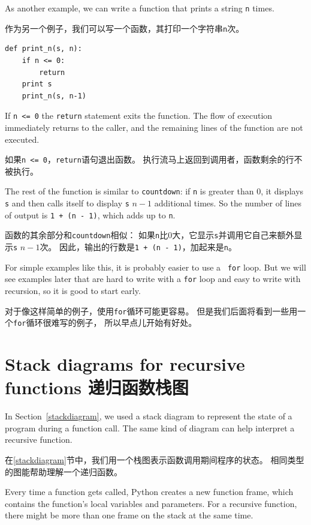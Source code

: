 \documentclass[10pt]{book}
\begin{document}
\begin{CJK}{UTF8}{gbsn}
As another example, we can write a function that prints a
string {\tt n} times.

作为另一个例子，我们可以写一个函数，其打印一个字符串{\tt n}次。

\begin{verbatim}
def print_n(s, n):
    if n <= 0:
        return
    print s
    print_n(s, n-1)
\end{verbatim}
%
If {\tt n <= 0} the {\tt return} statement exits the function.  The
flow of execution immediately returns to the caller, and the remaining
lines of the function are not executed.

如果{\tt n <= 0}，{\tt return}语句退出函数。
执行流马上返回到调用者，函数剩余的行不被执行。

The rest of the function is similar to {\tt countdown}: if {\tt n} is
greater than 0, it displays {\tt s} and then calls itself to display
{\tt s} $n-1$ additional times.  So the number of lines of output
is {\tt 1 + (n - 1)}, which adds up to {\tt n}.

函数的其余部分和{\tt countdown}相似：
如果{\tt n}比0大，它显示{\tt s}并调用它自己来额外显示{\tt s} $n-1$次。
因此，输出的行数是{\tt 1 + (n - 1)}，加起来是{\tt n}。

For simple examples like this, it is probably easier to use a {\tt
for} loop.  But we will see examples later that are hard to write
with a {\tt for} loop and easy to write with recursion, so it is
good to start early.

对于像这样简单的例子，使用{\tt for}循环可能更容易。
但是我们后面将看到一些用一个{\tt for}循环很难写的例子，
所以早点儿开始有好处。


\section{Stack diagrams for recursive functions 递归函数栈图}
\label{recursive.stack}

In Section~\ref{stackdiagram}, we used a stack diagram to represent
the state of a program during a function call.  The same kind of
diagram can help interpret a recursive function.

在\ref{stackdiagram}节中，我们用一个栈图表示函数调用期间程序的状态。
相同类型的图能帮助理解一个递归函数。

Every time a function gets called, Python creates a new function
frame, which contains the function's local variables and parameters.
For a recursive function, there might be more than one frame on the
stack at the same time.


\end{CJK}
\end{document}
